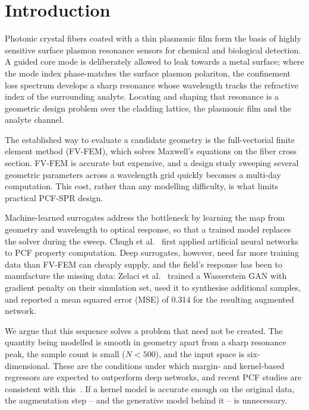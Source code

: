 \documentclass[iicol,pdflatex,sn-basic,Numbered]{sn-jnl}
\begin{document}

\maketitle

\section{Introduction}\label{sec:intro}

Photonic crystal fibers coated with a thin plasmonic film form the basis of
highly sensitive surface plasmon resonance sensors for chemical and biological
detection. A guided core mode is deliberately allowed to leak towards a metal
surface; where the mode index phase-matches the surface plasmon polariton, the
confinement loss spectrum develops a sharp resonance whose wavelength tracks the
refractive index of the surrounding analyte. Locating and shaping that resonance
is a geometric design problem over the cladding lattice, the plasmonic film and
the analyte channel.

The established way to evaluate a candidate geometry is the full-vectorial finite
element method (FV-FEM), which solves Maxwell's equations on the fiber cross
section. FV-FEM is accurate but expensive, and a design study sweeping several
geometric parameters across a wavelength grid quickly becomes a multi-day
computation. This cost, rather than any modelling difficulty, is what limits
practical PCF-SPR design.

Machine-learned surrogates address the bottleneck by learning the map from
geometry and wavelength to optical response, so that a trained model replaces the
solver during the sweep. Chugh et al.~\cite{chugh2019} first applied artificial
neural networks to PCF property computation. Deep surrogates, however, need far
more training data than FV-FEM can cheaply supply, and the field's response has
been to manufacture the missing data: Zelaci et al.~\cite{zelaci2021} trained a
Wasserstein GAN with gradient penalty on their simulation set, used it to
synthesise additional samples, and reported a mean squared error (MSE) of 0.314
for the resulting augmented network.

We argue that this sequence solves a problem that need not be created. The
quantity being modelled is smooth in geometry apart from a sharp resonance peak,
the sample count is small ($N < 500$), and the input space is six-dimensional.
These are the conditions under which margin- and kernel-based regressors are
expected to outperform deep networks, and recent PCF studies are consistent with
this~\cite{kaium2024,opoku2026}. If a kernel model is accurate enough on the
original data, the augmentation step -- and the generative model behind it -- is
unnecessary.
\end{document}
